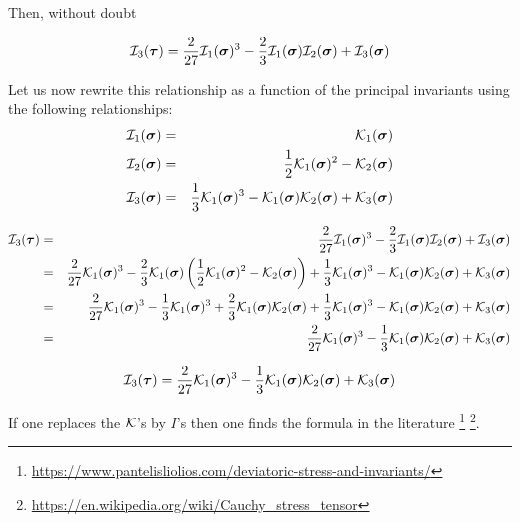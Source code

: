 Then, without doubt

\begin{mdframed}[backgroundcolor=blue!5]
\[
{\cal I}_3(\bm\tau) =
 \frac{2}{27}  {\cal I}_1(\bm\sigma)^3 - \frac23{\cal I}_1(\bm\sigma) {\cal I}_2(\bm\sigma)
+{\cal I}_3(\bm\sigma)
\]
\end{mdframed}


Let us now rewrite this relationship as a function of the principal invariants using the 
following relationships:
\begin{eqnarray}
{\cal I}_1({\bm \sigma})&=& {\cal K}_1({\bm \sigma}) \nonumber\\ 
{\cal I}_2({\bm \sigma})&=& \frac{1}{2}{\cal K}_1({\bm \sigma})^2-{\cal K}_2({\bm \sigma}) \nonumber\\
{\cal I}_3({\bm \sigma})&=& \frac{1}{3}{\cal K}_1({\bm \sigma})^3-{\cal K}_1({\bm \sigma}) \nonumber
{\cal K}_2({\bm \sigma}) +{\cal K}_3({\bm \sigma})
\end{eqnarray}

\begin{eqnarray}
{\cal I}_3(\bm\tau) 
&=& \frac{2}{27} {\cal I}_1(\bm\sigma)^3 
-\frac23 {\cal I}_1(\bm\sigma){\cal I}_2(\bm\sigma) + {\cal I}_3(\bm \sigma) \nonumber\\
&=& \frac{2}{27} {\cal K}_1(\bm\sigma)^3
-\frac23 {\cal K}_1(\bm\sigma)  \left( \frac{1}{2}{\cal K}_1({\bm \sigma})^2 -{\cal K}_2({\bm \sigma}) \right)
+ \frac{1}{3}{\cal K}_1({\bm \sigma})^3 -{\cal K}_1({\bm \sigma}) 
{\cal K}_2({\bm \sigma}) +{\cal K}_3({\bm \sigma}) \nonumber\\
&=& \frac{2}{27} {\cal K}_1(\bm\sigma)^3
-\frac13 {\cal K}_1(\bm\sigma)^3 
+\frac23 {\cal K}_1(\bm\sigma)  {\cal K}_2({\bm \sigma}) 
+ \frac{1}{3}{\cal K}_1({\bm \sigma})^3 -{\cal K}_1({\bm \sigma}) {\cal K}_2({\bm \sigma}) 
+{\cal K}_3({\bm \sigma}) \nonumber\\
&=& \frac{2}{27} {\cal K}_1(\bm\sigma)^3
-\frac13 {\cal K}_1(\bm\sigma)  {\cal K}_2({\bm \sigma}) 
+{\cal K}_3({\bm \sigma}) 
\end{eqnarray}

\begin{mdframed}[backgroundcolor=blue!5]
\begin{equation}
{\cal I}_3(\bm\tau) 
= 
\frac{2}{27} {\cal K}_1(\bm\sigma)^3 -\frac13 {\cal K}_1(\bm\sigma)  {\cal K}_2({\bm \sigma}) +{\cal K}_3({\bm \sigma}) 
\end{equation}
\end{mdframed}

If one replaces the ${\cal K}$'s by $I$'s then one finds the formula in the literature 
\footnote{\url{https://www.pantelisliolios.com/deviatoric-stress-and-invariants/}}
\footnote{\url{https://en.wikipedia.org/wiki/Cauchy_stress_tensor}}.


